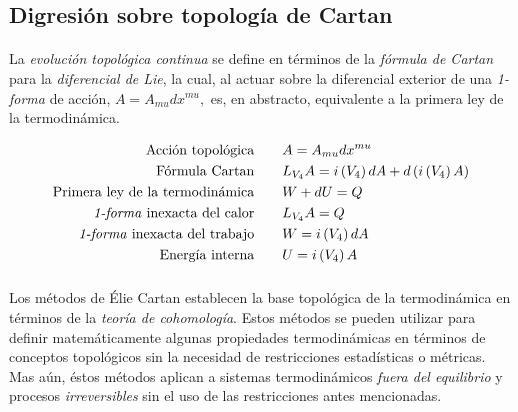 \documentclass{article}
\theoremstyle{definition} \newtheorem{defi}{Definici\'on}
\theoremstyle{definition} \newtheorem{teo}{Teorema}
\theoremstyle{definition} \newtheorem{cor}{Corolario}
\begin{document}
\subsection{Digresi\'on sobre topolog\'ia de Cartan}
\paragraph{}
La \emph{evoluci\'on topol\'ogica continua} se define en t\'erminos de la \emph{f\'ormula de Cartan} para la \emph{diferencial de Lie}, la cual, al actuar sobre la diferencial exterior de una \emph{1-forma} de acci\'on,  $A=A_{mu} dx^{mu},$ es, en abstracto, equivalente a la primera ley de la termodin\'amica.\cite{CMF}

\begin{align}
\text{Acci\'on topol\'ogica}	 &	      \qquad A=A_{mu} dx^{mu} \nonumber \\ 
\text{F\'ormula Cartan} &	      \qquad	L_{V_4}A=i\left(V_4\right)dA+d\left(i\left(V_4\right)A\right) \nonumber \\
\text{Primera ley de la termodin\'amica}    &    \qquad W+dU=Q \nonumber \\
\text{\emph{1-forma} inexacta del calor}    &    \qquad L_{V_4}A=Q \nonumber \\
\text{\emph{1-forma} inexacta del trabajo}  &    \qquad W=i\left(V_4\right)dA \nonumber \\
\text{Energ\'ia interna}		    &    \qquad U=i\left(V_4\right)A \nonumber
\end{align}
\subparagraph{}
Los m\'etodos de \'Elie Cartan establecen la base topol\'ogica de la termodin\'amica en t\'erminos de la \emph{teor\'ia de cohomolog\'ia}. Estos m\'etodos se pueden utilizar para definir matem\'aticamente algunas propiedades termodin\'amicas en t\'erminos de conceptos topol\'ogicos sin la necesidad de restricciones estad\'isticas o m\'etricas. Mas a\'un, \'estos m\'etodos aplican a sistemas termodin\'amicos \emph{fuera del equilibrio} y procesos \emph{irreversibles} sin el uso de las restricciones antes mencionadas.
\end{document}
